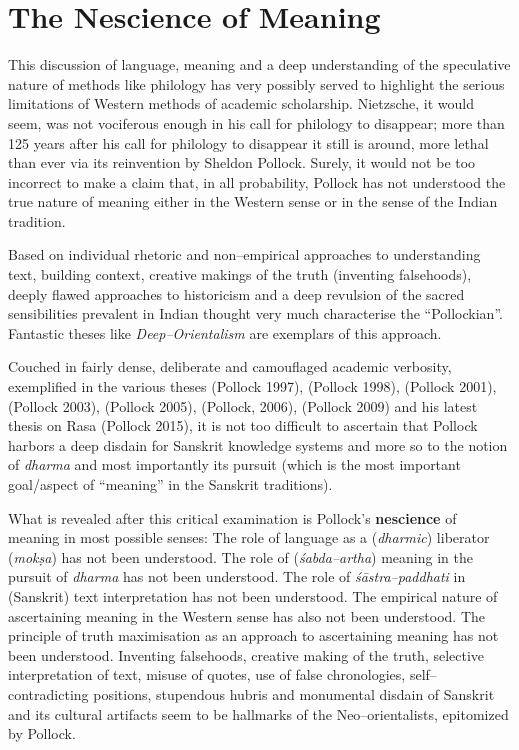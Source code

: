 \section*{The Nescience of Meaning}

This discussion of language, meaning and a deep understanding of the speculative nature of methods like philology has very possibly served to highlight the serious limitations of Western methods of academic scholarship. Nietzsche, it would seem, was not vociferous enough in his call for philology to disappear; more than 125 years after his call for philology to disappear it still is around, more lethal than ever via its reinvention by Sheldon Pollock. Surely, it would not be too incorrect to make a claim that, in all probability, Pollock has not understood the true nature of meaning either in the Western sense or in the sense of the Indian tradition.

Based on individual rhetoric and non–empirical approaches to understanding text, building context, creative makings of the truth (inventing falsehoods), deeply flawed approaches to historicism and a deep revulsion of the sacred sensibilities prevalent in Indian thought very much characterise the “Pollockian”. Fantastic theses like \textit{Deep–Orientalism} are exemplars of this approach.

Couched in fairly dense, deliberate and camouflaged academic verbosity, exemplified in the various theses (Pollock 1997), (Pollock 1998), (Pollock 2001),(Pollock 2003), (Pollock 2005), (Pollock, 2006), (Pollock 2009) and his latest thesis on Rasa (Pollock 2015), it is not too difficult to ascertain that Pollock harbors a deep disdain for Sanskrit knowledge systems and more so to the notion of \textit{dharma} and most importantly its pursuit (which is the most important goal/aspect of “meaning” in the Sanskrit traditions).

What is revealed after this critical examination is Pollock’s \textbf{nescience} of meaning in most possible senses: The role of language as a (\textit{dharmic}) liberator (\textit{mokṣa}) has not been understood. The role of (\textit{śabda–artha}) meaning in the pursuit of \textit{dharma} has not been understood. The role of \textit{śāstra–paddhati} in (Sanskrit) text interpretation has not been understood. The empirical nature of ascertaining meaning in the Western sense has also not been understood. The principle of truth maximisation as an approach to ascertaining meaning has not been understood. Inventing falsehoods, creative making of the truth, selective interpretation of text, misuse of quotes, use of false chronologies, self–contradicting positions, stupendous hubris and monumental disdain of Sanskrit and its cultural artifacts seem to be hallmarks of the Neo–orientalists, epitomized by Pollock.


